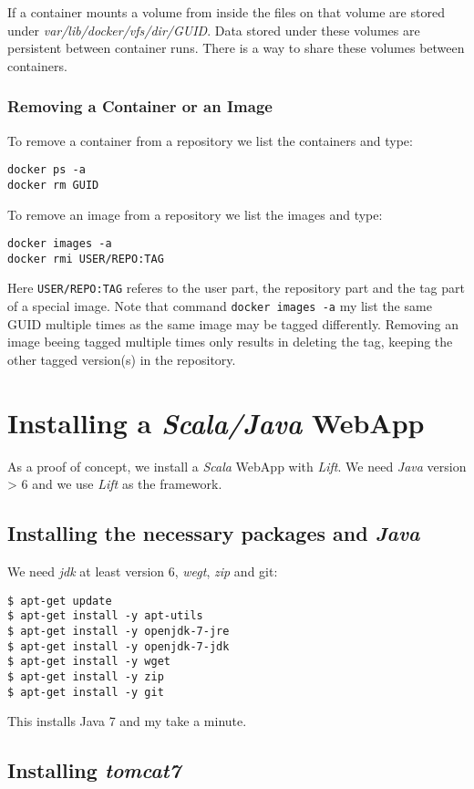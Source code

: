 \documentclass[11pt]{article}
\begin{document}
    If a container mounts a volume from inside the files on that volume are stored under \emph{var/lib/docker/vfs/dir/GUID}. Data stored under these volumes are persistent between container runs. There is a way to share these volumes between containers. 
\subsubsection{Removing a Container or an Image}
\label{sec-2-6-4}

To remove a container from a repository we list the containers and type:

\begin{verbatim}
docker ps -a
docker rm GUID
\end{verbatim}
To remove an image from a repository we list the images and type:

\begin{verbatim}
docker images -a
docker rmi USER/REPO:TAG
\end{verbatim}
Here \texttt{USER/REPO:TAG} referes to the user part, the repository part and the tag part of a special image. Note that command \texttt{docker images -a} my list the same GUID multiple times as the same image may be tagged differently. Removing an image beeing tagged multiple times only results in deleting the tag, keeping the other tagged version(s) in the repository.   
\section{Installing a \emph{Scala/Java} WebApp}
\label{sec-3}

As a proof of concept, we install a \emph{Scala} WebApp with \emph{Lift}. We need \emph{Java} version > 6 and we use \emph{Lift} as the framework. 
\subsection{Installing the necessary packages and \emph{Java}}
\label{sec-3-1}

We need \emph{jdk} at least version 6, \emph{wegt}, \emph{zip} and git:

\begin{verbatim}
$ apt-get update
$ apt-get install -y apt-utils
$ apt-get install -y openjdk-7-jre
$ apt-get install -y openjdk-7-jdk
$ apt-get install -y wget
$ apt-get install -y zip
$ apt-get install -y git
\end{verbatim}
This installs Java 7 and my take a minute.
\subsection{Installing \emph{tomcat7}}
\label{sec-3-2}
\end{document}
